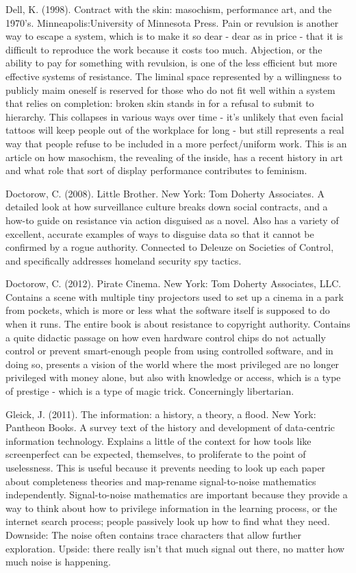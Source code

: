 Dell, K. (1998). Contract with the skin: masochism, performance art, and the 1970's. Minneapolis:University of Minnesota Press.
	Pain or revulsion is another way to escape a system, which is to make it so dear - dear as in price - that it is difficult to reproduce the work because it costs too much. Abjection, or the ability to pay for something with revulsion, is one of the less efficient but more effective systems of resistance. The liminal space represented by a willingness to publicly maim oneself is reserved for those who do not fit well within a system that relies on completion: broken skin stands in for a refusal to submit to hierarchy. 
This collapses in various ways over time - it’s unlikely that even facial tattoos will keep people out of the workplace for long - but still represents a real way that people refuse to be included in a more perfect/uniform work. This is an article on how masochism, the revealing of the inside, has a recent history in art and what role that sort of display performance contributes to feminism.
	

Doctorow, C. (2008). Little Brother. New York: Tom Doherty Associates.
	A detailed look at how surveillance culture breaks down social contracts, and a how-to guide on resistance via action disguised as a novel. Also has a variety of excellent, accurate examples of ways to disguise data so that it cannot be confirmed by a rogue authority. Connected to Deleuze on Societies of Control, and specifically addresses homeland security spy tactics.

Doctorow, C. (2012). Pirate Cinema. New York: Tom Doherty Associates, LLC.
	Contains a scene with multiple tiny projectors used to set up a cinema in a park from pockets, which is more or less what the software itself is supposed to do when it runs. The entire book is about resistance to copyright authority. Contains a quite didactic passage on how even hardware control chips do not actually control or prevent smart-enough people from using controlled software, and in doing so, presents a vision of the world where the most privileged are no longer privileged with money alone, but also with knowledge or access, which is a type of prestige - which is a type of magic trick. Concerningly libertarian.

Gleick, J. (2011). The information: a history, a theory, a flood. New York: Pantheon Books.
	A survey text of the history and development of data-centric information technology. Explains a little of the context for how tools like screenperfect can be expected, themselves, to proliferate to the point of uselessness. This is useful because it prevents needing to look up each paper about completeness theories and map-rename signal-to-noise mathematics independently. Signal-to-noise mathematics are important because they provide a way to think about how to privilege information in the learning process, or the internet search process; people passively look up how to find what they need. Downside: The noise often contains trace characters that allow further exploration. Upside: there really isn’t that much signal out there, no matter how much noise is happening.

